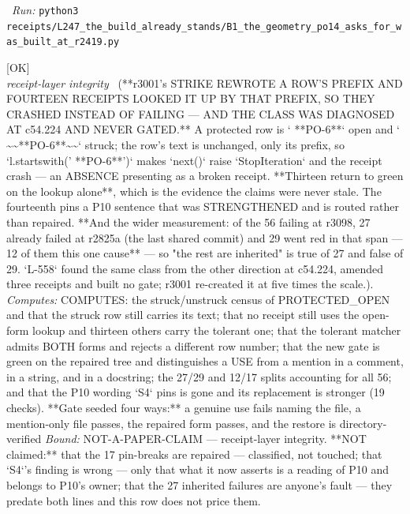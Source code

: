 \begin{description}
\ \emph{Run:} \texttt{python3 receipts/L247\_the\_build\_already\_stands/B1\_the\_geometry\_po14\_asks\_for\_was\_built\_at\_r2419.py}
\item[\label{rcpt:R1_r3001_struck_fourteen_rows_and_twelve_receipts_read_them_by_prefix}\texttt{R1\_r3001\_struck\_fourteen\_rows\_and\_twelve\_receipts\_read\_them\_by\_prefix}]\hfill\textsf{[OK]}\\
\textit{receipt-layer integrity} \ (**r3001's STRIKE REWROTE A ROW'S PREFIX AND FOURTEEN RECEIPTS LOOKED IT UP BY THAT PREFIX, SO THEY CRASHED INSTEAD OF FAILING --- AND THE CLASS WAS DIAGNOSED AT c54.224 AND NEVER GATED.** A protected row is `\textbar{} **PO-6**` open and `\textbar{} \textasciitilde{}\textasciitilde{}**PO-6**\textasciitilde{}\textasciitilde{}` struck; the row's text is unchanged, only its prefix, so `l.startswith('\textbar{} **PO-6**')` makes `next()` raise `StopIteration` and the receipt crash --- an ABSENCE presenting as a broken receipt. **Thirteen return to green on the lookup alone**, which is the evidence the claims were never stale. The fourteenth pins a P10 sentence that was STRENGTHENED and is routed rather than repaired. **And the wider measurement: of the 56 failing at r3098, 27 already failed at r2825a (the last shared commit) and 29 went red in that span --- 12 of them this one cause** --- so "the rest are inherited" is true of 27 and false of 29. `L-558` found the same class from the other direction at c54.224, amended three receipts and built no gate; r3001 re-created it at five times the scale.). 
\emph{Computes:} COMPUTES: the struck/unstruck census of PROTECTED\_OPEN and that the struck row still carries its text; that no receipt still uses the open-form lookup and thirteen others carry the tolerant one; that the tolerant matcher admits BOTH forms and rejects a different row number; that the new gate is green on the repaired tree and distinguishes a USE from a mention in a comment, in a string, and in a docstring; the 27/29 and 12/17 splits accounting for all 56; and that the P10 wording `S4` pins is gone and its replacement is stronger (19 checks). **Gate seeded four ways:** a genuine use fails naming the file, a mention-only file passes, the repaired form passes, and the restore is directory-verified
 \emph{Bound:} NOT-A-PAPER-CLAIM --- receipt-layer integrity. **NOT claimed:** that the 17 pin-breaks are repaired --- classified, not touched; that `S4`'s finding is wrong --- only that what it now asserts is a reading of P10 and belongs to P10's owner; that the 27 inherited failures are anyone's fault --- they predate both lines and this row does not price them.

\end{description}
